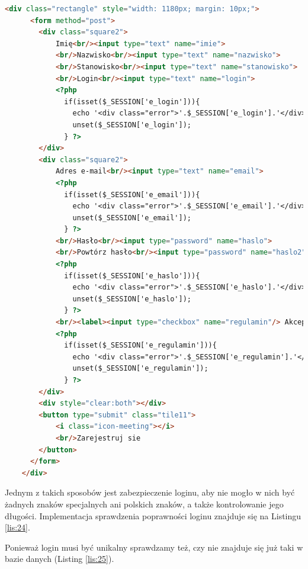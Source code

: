 \documentclass[eng,printmode,openany,oneside]{mgr}
\begin{document}
	
\begin{lstlisting}[caption={Implementacja formularza do rejestracji pracownika}, language=HTML, label={lis:23}]
<div class="rectangle" style="width: 1180px; margin: 10px;">
      <form method="post">
        <div class="square2">
            Imię<br/><input type="text" name="imie">
            <br/>Nazwisko<br/><input type="text" name="nazwisko">
            <br/>Stanowisko<br/><input type="text" name="stanowisko">
            <br/>Login<br/><input type="text" name="login">
            <?php
              if(isset($_SESSION['e_login'])){
                echo '<div class="error">'.$_SESSION['e_login'].'</div>';
                unset($_SESSION['e_login']);
              } ?>
        </div>
        <div class="square2">
            Adres e-mail<br/><input type="text" name="email">
            <?php
              if(isset($_SESSION['e_email'])){
                echo '<div class="error">'.$_SESSION['e_email'].'</div>';
                unset($_SESSION['e_email']);
              } ?>
            <br/>Hasło<br/><input type="password" name="haslo">
            <br/>Powtórz hasło<br/><input type="password" name="haslo2">
            <?php
              if(isset($_SESSION['e_haslo'])){
                echo '<div class="error">'.$_SESSION['e_haslo'].'</div>';
                unset($_SESSION['e_haslo']);
              } ?>
            <br/><label><input type="checkbox" name="regulamin"/> Akceptuje regulamin</label>
            <?php
              if(isset($_SESSION['e_regulamin'])){
                echo '<div class="error">'.$_SESSION['e_regulamin'].'</div>';
                unset($_SESSION['e_regulamin']);
              } ?>
        </div>
        <div style="clear:both"></div>
        <button type="submit" class="tile11">
            <i class="icon-meeting"></i>
            <br/>Zarejestruj sie
        </button>
      </form>
    </div>
\end{lstlisting}

	
	
	
	
	
	
	






	
Jednym z takich sposobów jest zabezpieczenie loginu, aby nie mogło w nich być żadnych znaków specjalnych ani polskich znaków, a także kontrolowanie jego długości. Implementacja sprawdzenia poprawności loginu znajduje się na Listingu \ref{lis:24}.

Ponieważ login musi być unikalny sprawdzamy też, czy nie znajduje się już taki w bazie danych (Listing \ref{lis:25}).
	
\end{document}

